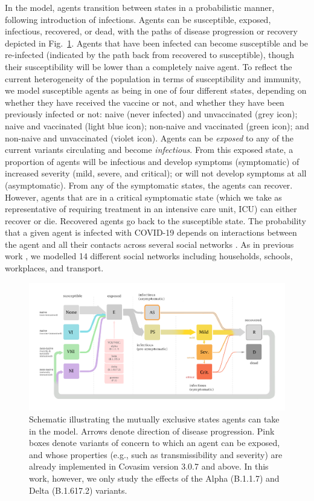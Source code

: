 \documentclass[article, a4, authoryear]{elsarticle}
\begin{document}
In the model, agents transition between states in a probabilistic manner, following introduction of infections. Agents can be susceptible, exposed, infectious, recovered, or dead, with the paths of disease progression or recovery depicted in Fig.~\ref{fig:covasim_qld_schematic}. Agents that have been infected can become susceptible and be re-infected (indicated by the path back from recovered to susceptible), though their susceptibility will be lower than a completely naive agent. To reflect the current heterogeneity of the population in terms of susceptibility and immunity, we model susceptible agents as being in one of four different states, depending on whether they have received the vaccine or not, and whether they have been previously infected or not: naive (never infected) and unvaccinated (grey icon);  naive and vaccinated (light blue icon); non-naive and vaccinated (green icon); and non-naive and unvaccinated (violet icon). Agents can be \textit{exposed} to any of the current variants circulating and become \textit{infectious}. From this exposed state, a proportion of agents will be infectious and develop symptoms (symptomatic) of increased severity (mild, severe, and critical); or will not develop symptoms at all (asymptomatic). From any of the symptomatic states, the agents can recover. However, agents that are in a critical symptomatic state (which we take as representative of requiring treatment in an intensive care unit, ICU) can either recover or die. Recovered agents go back to the susceptible state. The probability that a given agent is infected with COVID-19 depends on interactions between the agent and all their contacts across several social networks \cite{kerr2020covasim,scott2020modelling,sanz-leon2021qldmodel}. As in previous work \cite{sanz-leon2021qldmodel}, we modelled 14 different social networks including households, schools, workplaces, and transport. 

\begin{figure}[h]
    \centering
    \includegraphics[width=1.0\textwidth]{figures/fig01_seir_v4 copy.png} 
    \caption{Schematic illustrating the mutually exclusive states agents can take in the model. Arrows denote direction of disease progression. Pink boxes denote variants of concern to which an agent can be exposed, and whose properties (e.g., such as transmissibility and severity) are already implemented in Covasim version 3.0.7 and above\cite{cohen2021mechanistic}. In this work, however, we only study the effects of the Alpha (B.1.1.7) and Delta (B.1.617.2) variants.}
\label{fig:covasim_qld_schematic}
\end{figure}
\end{document}
